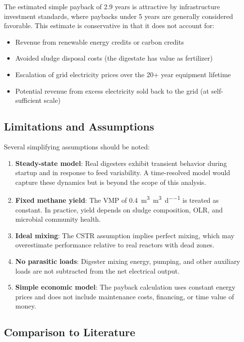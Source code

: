 \documentclass[12pt, letterpaper]{article}
\begin{document}
The estimated simple payback of 2.9 years is attractive by infrastructure investment standards, where paybacks under 5 years are generally considered favorable. This estimate is conservative in that it does not account for:
\begin{itemize}[noitemsep]
  \item Revenue from renewable energy credits or carbon credits
  \item Avoided sludge disposal costs (the digestate has value as fertilizer)
  \item Escalation of grid electricity prices over the 20+ year equipment lifetime
  \item Potential revenue from excess electricity sold back to the grid (at self-sufficient scale)
\end{itemize}

\subsection{Limitations and Assumptions}

Several simplifying assumptions should be noted:
\begin{enumerate}[noitemsep]
  \item \textbf{Steady-state model}: Real digesters exhibit transient behavior during startup and in response to feed variability. A time-resolved model would capture these dynamics but is beyond the scope of this analysis.
  \item \textbf{Fixed methane yield}: The VMP of \SI{0.4}{\cubic\metre\per\cubic\metre\per\day} is treated as constant. In practice, yield depends on sludge composition, OLR, and microbial community health.
  \item \textbf{Ideal mixing}: The CSTR assumption implies perfect mixing, which may overestimate performance relative to real reactors with dead zones.
  \item \textbf{No parasitic loads}: Digester mixing energy, pumping, and other auxiliary loads are not subtracted from the net electrical output.
  \item \textbf{Simple economic model}: The payback calculation uses constant energy prices and does not include maintenance costs, financing, or time value of money.
\end{enumerate}

\subsection{Comparison to Literature}
\end{document}
